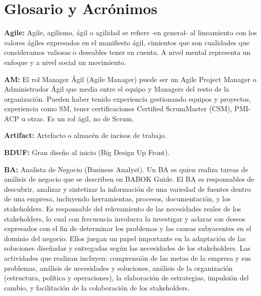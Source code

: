\chapter{Glosario y Acrónimos}


  \begin{description}    
  
  \item {\textbf{Agile:} Agile, agilismo, ágil o agilidad se refiere -en general- al lineamiento con los valores ágiles expresados en el manifiesto ágil, cimientos que son cualidades que consideramos valiosas o deseables tener en cuenta. A nivel mental representa un enfoque y a nivel social un movimiento.}
  
  \item {\textbf{AM:} El rol Manager Ágil (Agile Manager) puede ser un Agile Project Manager o Administrador Ágil que media entre el equipo y Managers del resto de la organización. Pueden haber tenido experiencia gestionando equipos y proyectos, experiencia como SM, tener certificaciones Certified ScrumMaster (CSM), PMI-ACP u otras. Es un rol ágil, no de Scrum. } 
   
  \item {\textbf{Artifact:} Artefacto o almacén de incisos de trabajo.}  
 
  \item {\textbf{BDUF:} Gran diseño al inicio (Big Design Up Front).}  
  
  \item {\textbf{BA:} Analista de Negocio (Business Analyst). Un BA es quien realiza tareas de análisis de negocio que se describen en BABOK Guide. El BA es responsables de descubrir, analizar y sintetizar la información de una variedad de fuentes dentro de una empresa, incluyendo herramientas, procesos, documentación, y los stakeholders. Es responsable del relevamiento de las necesidades reales de los stakeholders, lo cual con frecuencia involucra la investigar y aclarar sus deseos expresados con el fin de determinar los problemas y las causas subyacentes en el dominio del negocio. Ellos juegan un papel importante en la adaptación de las soluciones diseñadas y entregadas según las necesidades de los stakeholders. Las actividades que realizan incluyen: comprensión de las metas de la empresa y sus problemas, análisis de necesidades y soluciones, análisis de la organización (estructura, política y operaciones), la elaboración de estrategias, impulsión del cambio, y facilitación de la colaboración de los stakeholders.}
   

\end{description}
